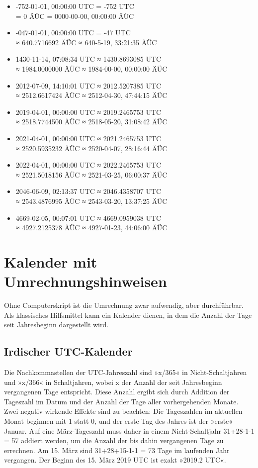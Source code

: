 \begin{itemize}
    \item -752-01-01, 00:00:00 UTC = -752 UTC\\ = 0 ÄÜC = 0000-00-00, 00:00:00 ÄÜC
    \item -047-01-01, 00:00:00 UTC = -47 UTC\\ ≈ 640.7716692 ÄÜC ≈ 640-5-19, 33:21:35 ÄÜC
    \item 1430-11-14, 07:08:34 UTC ≈ 1430.8693085 UTC\\ ≈ 1984.0000000 ÄÜC ≈ 1984-00-00, 00:00:00 ÄÜC
    \item 2012-07-09, 14:10:01 UTC ≈ 2012.5207385 UTC\\ ≈ 2512.6617424 ÄÜC ≈ 2512-04-30, 47:44:15 ÄÜC
    \item 2019-04-01, 00:00:00 UTC ≈ 2019.2465753 UTC\\ ≈ 2518.7744500 ÄÜC ≈ 2518-05-20, 31:08:42 ÄÜC
    \item 2021-04-01, 00:00:00 UTC ≈ 2021.2465753 UTC\\ ≈ 2520.5935232 ÄÜC ≈ 2520-04-07, 28:16:44 ÄÜC
    \item 2022-04-01, 00:00:00 UTC ≈ 2022.2465753 UTC\\ ≈ 2521.5018156 ÄÜC ≈ 2521-03-25, 06:00:37 ÄÜC
    \item 2046-06-09, 02:13:37 UTC ≈ 2046.4358707 UTC\\ ≈ 2543.4876995 ÄÜC ≈ 2543-03-20, 13:37:25 ÄÜC
    \item 4669-02-05, 00:07:01 UTC ≈ 4669.0959038 UTC\\ ≈ 4927.2125378 ÄÜC ≈ 4927-01-23, 44:06:00 ÄÜC
\end{itemize}


\section{Kalender mit Umrechnungshinweisen}

Ohne Computerskript ist die Umrechnung zwar aufwendig, aber durchführbar. Als klassisches Hilfsmittel kann ein Kalender dienen, in dem die Anzahl der Tage seit Jahresbeginn dargestellt wird.

\subsection{Irdischer UTC-Kalender}

Die Nachkommastellen der UTC-Jahreszahl sind »x/365« in Nicht-Schaltjahren und »x/366« in Schaltjahren, wobei x der Anzahl der seit Jahresbeginn vergangenen Tage entspricht. Diese Anzahl ergibt sich durch Addition der Tageszahl im Datum und der Anzahl der Tage aller vorhergehenden Monate. Zwei negativ wirkende Effekte sind zu beachten: Die Tageszahlen im aktuellen Monat beginnen mit 1 statt 0, und der erste Tag des Jahres ist der »erste« Januar. Auf eine März-Tageszahl muss daher in einem Nicht-Schaltjahr 31+28-1-1 = 57 addiert werden, um die Anzahl der bis dahin vergangenen Tage zu errechnen. Am 15. März sind 31+28+15-1-1 = 73 Tage im laufenden Jahr vergangen. Der Beginn des 15. März 2019 UTC ist exakt »2019.2 UTC«.

